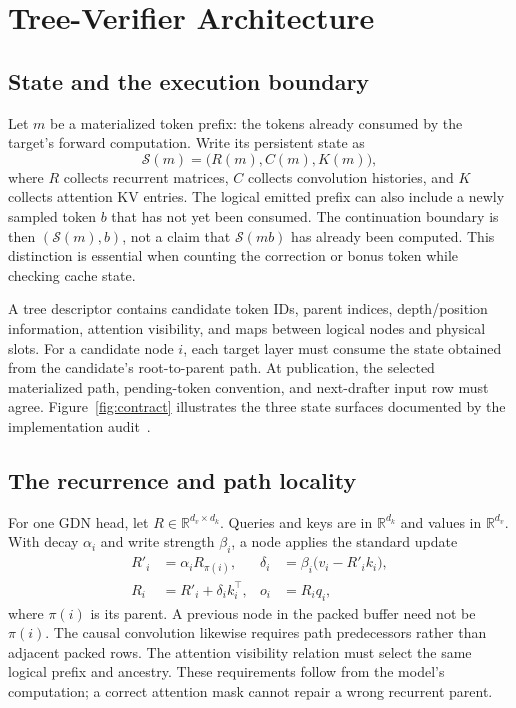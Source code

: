 \documentclass[conference]{IEEEtran}
\begin{document}
\section{Tree-Verifier Architecture}
\label{sec:contract}
\subsection{State and the execution boundary}
Let $m$ be a materialized token prefix: the tokens already consumed by the target's forward computation. Write its persistent state as
\begin{equation}
\mathcal{S}(m)=\bigl(R(m),C(m),K(m)\bigr),
\end{equation}
where $R$ collects recurrent matrices, $C$ collects convolution histories, and $K$ collects attention KV entries. The logical emitted prefix can also include a newly sampled token $b$ that has not yet been consumed. The continuation boundary is then $(\mathcal{S}(m),b)$, not a claim that $\mathcal{S}(mb)$ has already been computed. This distinction is essential when counting the correction or bonus token while checking cache state.

A tree descriptor contains candidate token IDs, parent indices, depth/position information, attention visibility, and maps between logical nodes and physical slots. For a candidate node $i$, each target layer must consume the state obtained from the candidate's root-to-parent path. At publication, the selected materialized path, pending-token convention, and next-drafter input row must agree. Figure~\ref{fig:contract} illustrates the three state surfaces documented by the implementation audit~\cite{lumo2026stateless,lumo2026archive}.

\subsection{The recurrence and path locality}
For one GDN head, let $R\in\mathbb{R}^{d_v\times d_k}$. Queries and keys are in $\mathbb{R}^{d_k}$ and values in $\mathbb{R}^{d_v}$. With decay $\alpha_i$ and write strength $\beta_i$, a node applies the standard update~\cite{yang2024gated}
\begin{align}
R'_i &= \alpha_i R_{\pi(i)}, &
\delta_i &= \beta_i\bigl(v_i-R'_i k_i\bigr),\\
R_i &= R'_i+\delta_i k_i^\top, &
o_i &= R_iq_i,
\end{align}
where $\pi(i)$ is its parent. A previous node in the packed buffer need not be $\pi(i)$. The causal convolution likewise requires path predecessors rather than adjacent packed rows. The attention visibility relation must select the same logical prefix and ancestry. These requirements follow from the model's computation; a correct attention mask cannot repair a wrong recurrent parent.
\end{document}
